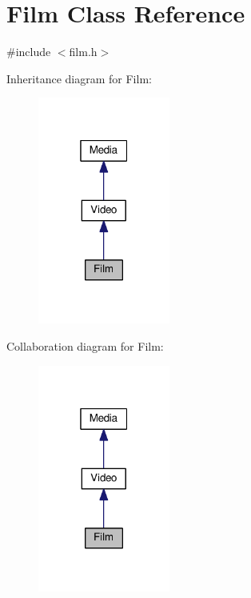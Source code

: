 \hypertarget{classFilm}{}\section{Film Class Reference}
\label{classFilm}


{\ttfamily \#include $<$film.\+h$>$}



Inheritance diagram for Film\+:\nopagebreak
\begin{figure}[H]
\begin{center}
\leavevmode
\includegraphics[width=123pt]{classFilm__inherit__graph}
\end{center}
\end{figure}


Collaboration diagram for Film\+:\nopagebreak
\begin{figure}[H]
\begin{center}
\leavevmode
\includegraphics[width=123pt]{classFilm__coll__graph}
\end{center}
\end{figure}

